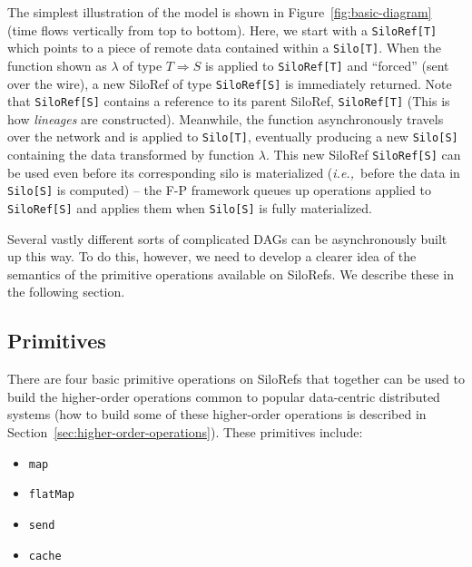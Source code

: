 \documentclass{sigplanconf}
\theoremstyle{definition}
\theoremstyle{definition}
\newcommand{\ie}{{\em i.e.,~}}
\begin{document}
The simplest illustration of the model is shown in Figure~\ref{fig:basic-diagram}
(time flows vertically from top to bottom). Here, we start with a
\verb|SiloRef[T]| which points to a piece of remote data contained within a
\verb|Silo[T]|. When the function shown as $\lambda$ of type $T \Rightarrow S$
is applied to \verb|SiloRef[T]| and ``forced'' (sent over the wire), a new
SiloRef of type \verb|SiloRef[S]| is immediately returned. Note that
\verb|SiloRef[S]| contains a reference to its parent SiloRef,
\verb|SiloRef[T]| (This is how {\em lineages} are constructed). Meanwhile, the
function asynchronously travels over the network and is applied to
\verb|Silo[T]|, eventually producing a new \verb|Silo[S]| containing the data
transformed by function $\lambda$. This new SiloRef \verb|SiloRef[S]| can be
used even before its corresponding silo is materialized (\ie before the data
in \verb|Silo[S]| is computed) – the F-P framework queues up operations
applied to \verb|SiloRef[S]| and applies them when \verb|Silo[S]| is fully
materialized.

Several vastly different sorts of complicated DAGs can be asynchronously built
up this way. To do this, however, we need to develop a clearer idea of the
semantics of the primitive operations available on SiloRefs. We describe these
in the following section.


\subsection{Primitives}
\label{sec:primitives}

There are four basic primitive operations on SiloRefs that together can be
used to build the higher-order operations common to popular data-centric
distributed systems (how to build some of these higher-order operations is
described in Section~\ref{sec:higher-order-operations}). These primitives
include:

\begin{itemize}[noitemsep,nolistsep]
\item \verb|map|
\item \verb|flatMap|
\item \verb|send|
\item \verb|cache|
\end{itemize}
\end{document}
